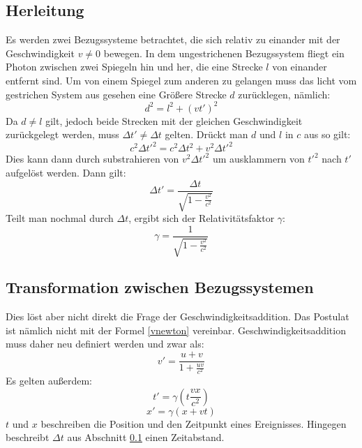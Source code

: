 \documentclass[12pt]{article}
\begin{document}
\subsection{Herleitung}
\label{herl}
Es werden zwei Bezugssysteme betrachtet, die sich relativ zu einander mit der Geschwindigkeit $v \neq 0$ bewegen.
In dem ungestrichenen Bezugssystem fliegt ein Photon zwischen zwei Spiegeln hin und her, die eine Strecke $l$ von einander entfernt sind.
Um von einem Spiegel zum anderen zu gelangen muss das licht vom gestrichen System aus gesehen eine Größere Strecke $d$ zurücklegen, nämlich:
\begin{equation}
d^2 = l^2 + (vt')^2
\end{equation}
Da $d \neq l$ gilt, jedoch beide Strecken mit der gleichen Geschwindigkeit zurückgelegt werden, muss $\Delta t' \neq \Delta t$ gelten.
Drückt man $d$ und $l$ in $c$ aus so gilt:
\begin{equation}
c^2 \Delta t'^2 = c^2 \Delta t^2 + v^2 \Delta t'^2
\end{equation}
Dies kann dann durch substrahieren von $v^2 \Delta t'^2$ um ausklammern von $t'^2$ nach $t'$ aufgelöst werden.
Dann gilt:
\begin{equation}
\Delta t' = \frac{\Delta t}{\sqrt{1-\frac{v^2}{c^2}}}
\end{equation}
Teilt man nochmal durch $\Delta t$, ergibt sich der Relativitätsfaktor $\gamma$:
\begin{equation}
\label{gamma}
\gamma = \frac{1}{\sqrt{1-\frac{v^2}{c^2}}}
\end{equation}
\subsection{Transformation zwischen Bezugssystemen}
\label{trans}
Dies löst aber nicht direkt die Frage der Geschwindigkeitsaddition.
Das Postulat ist nämlich nicht mit der Formel \ref{vnewton} vereinbar.
Geschwindigkeitsaddition muss daher neu definiert werden und zwar als:
\begin{equation}
\label{v}
v' = \frac{u + v}{1 + \frac{uv}{c^2}}
\end{equation}
Es gelten außerdem:
\begin{equation}
t' = \gamma(t \frac{vx}{c^2})
\end{equation}
\begin{equation}
x' = \gamma(x + vt)
\end{equation}
$t$ und $x$ beschreiben die Position und den Zeitpunkt eines Ereignisses.
Hingegen beschreibt $\Delta t$ aus Abschnitt \ref{herl} einen Zeitabstand.
\end{document}
